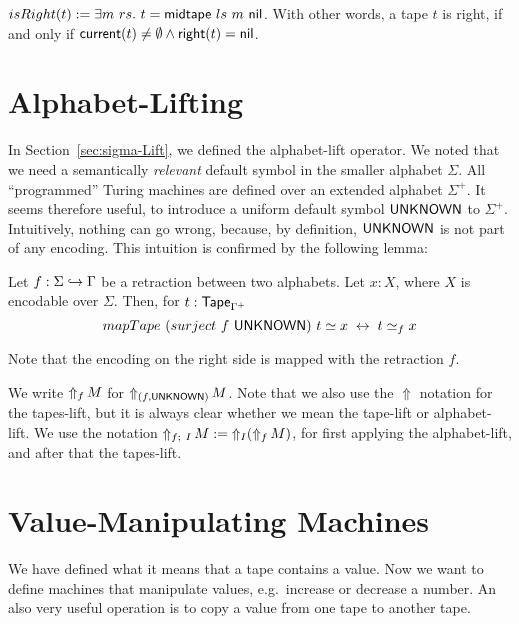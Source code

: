 \begin{definition}
  \label{def:isRght}
  $isRight(t) := \exists m~rs.~t=\MS{midtape}~ls~m~\nil$.
  With other words, a tape $t$ is right, if and only if $\MS{current}(t) \neq \None \land \MS{right}(t) = \nil$.
\end{definition}

\section{Alphabet-Lifting}
\label{sec:LiftAlphabet-UNKNOWN}

In Section~\ref{sec:sigma-Lift}, we defined the alphabet-lift operator.  We noted that we need a semantically \textit{relevant} default symbol in the
smaller alphabet $\Sigma$.  All ``programmed'' Turing machines are defined over an extended alphabet $\Sigma^+$.  It seems therefore useful, to
introduce a uniform default symbol $\MS{UNKNOWN}$ to $\Sigma^+$.  Intuitively, nothing can go wrong, because, by definition, $\MS{UNKNOWN}$ is not
part of any encoding.  This intuition is confirmed by the following lemma: %
\begin{lemma}
  \label{lem:contains_translate_tau}
  Let $f: \Sigma \hookrightarrow \Tau$ be a retraction between two alphabets.  Let $x:X$, where $X$ is encodable over $\Sigma$. Then, for
  $t:\Tape_{\Tau^+}$
  \[
    mapTape~(surject~f~\MS{UNKNOWN})~t \simeq x ~\iff~ t \simeq_f x
  \]
\end{lemma}
Note that the encoding on the right side is mapped with the retraction $f$.

We write $\LiftAlphabet{M}{f}$ for $\LiftAlphabet{M}{(f, \MS{UNKNOWN})}$.  Note that we also use the $\Uparrow$ notation for the tapes-lift, but it is
always clear whether we mean the tape-lift or alphabet-lift.  We use the notation $\LiftBoth{M}{f}{I} := \LiftTapes{(\LiftAlphabet{M}{f})}{I}$, for
first applying the alphabet-lift, and after that the tapes-lift.

\section{Value-Manipulating Machines}
\label{sec:value-manipulate}

We have defined what it means that a tape contains a value.  Now we want to define machines that manipulate values, e.g.\ increase or decrease a
number.  An also very useful operation is to copy a value from one tape to another tape.

